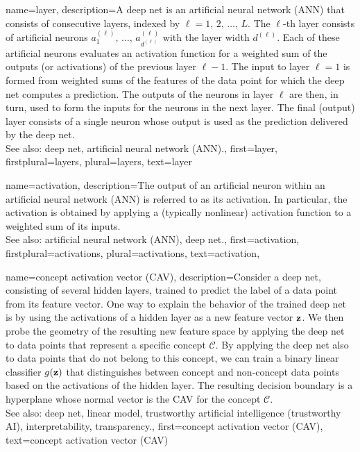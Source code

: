 {
{name={layer},
	description={A deep net is an artificial neural network (ANN) that consists of consecutive 
	    layers, indexed by $\ell=1,\,2,\,\ldots,\,L$. The $\ell$-th layer consists of 
		artificial neurons $a^{(\ell)}_{1},\,\ldots,\,a^{(\ell)}_{d^{(\ell)}}$ with 
		the layer width $d^{(\ell)}$. Each of these artificial neurons evaluates 
		an activation function for a weighted sum of the outputs (or activations) of the 
		previous layer $\ell-1$. The input to layer $\ell=1$ is formed from weighted sums 
		of the features of the data point for which the deep net computes 
		a prediction. The outputs of the neurons in layer $\ell$ are then, in turn, 
		used to form the inputs for the neurons in the next layer. The final (output) layer 
		consists of a single neuron whose 
		output is used as the prediction delivered by the deep net.  
		\\
		See also: deep net, artificial neural network (ANN).}, 
	first={layer},
	firstplural={layers},
	plural={layers}, 
	text={layer}
}


{name={activation},
	description={The output  of an artificial neuron within an artificial neural network (ANN) is referred 
		to as its activation. In particular, the activation is obtained by applying a (typically nonlinear) activation function 
		to a weighted sum of its inputs.
		\\
		See also: artificial neural network (ANN), deep net.}, 
	first={activation},
	firstplural={activations},
	plural={activations}, 
	text={activation}, 
}

{name={concept activation vector (CAV)},
	description={Consider a deep net, consisting  of several hidden layers, 
		trained to predict the label of a data point from its feature vector. One way 
		to explain the behavior of the trained deep net is by using the activations of a 
		hidden layer as a new feature vector ${\bf z}$. We then probe the geometry of the 
		resulting new feature space by applying the deep net to data points 
		that represent a specific concept $\mathcal{C}$. By applying the deep net also to data points 
		that do not belong to this concept, we can train a binary linear classifier $g({\bf z})$ that distinguishes 
		between concept and non-concept data points based on the activations of the hidden layer. The resulting 
		decision boundary is a hyperplane whose normal vector is the CAV for the concept $\mathcal{C}$. 
				\\
		 See also: deep net, linear model, trustworthy artificial intelligence (trustworthy AI), interpretability, transparency.}, 
	first={concept activation vector (CAV)},
	text={concept activation vector (CAV)}
}

}
